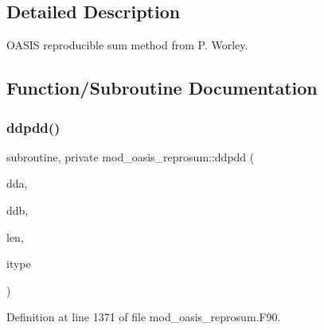 \subsection{Detailed Description}
O\+A\+S\+IS reproducible sum method from P. Worley. 

\subsection{Function/\+Subroutine Documentation}
\mbox{\label{namespacemod__oasis__reprosum_a24f9efa3ca739811888206eaf71d4690}} 
\subsubsection{\texorpdfstring{ddpdd()}{ddpdd()}}
{\footnotesize\ttfamily subroutine, private mod\+\_\+oasis\+\_\+reprosum\+::ddpdd (\begin{DoxyParamCaption}\item[{complex(r8), dimension(len), intent(in)}]{dda,  }\item[{complex(r8), dimension(len), intent(inout)}]{ddb,  }\item[{integer, intent(in)}]{len,  }\item[{integer, intent(in)}]{itype }\end{DoxyParamCaption})\hspace{0.3cm}{\ttfamily [private]}}



Definition at line 1371 of file mod\+\_\+oasis\+\_\+reprosum.\+F90.

\mbox{\label{namespacemod__oasis__reprosum_a398280c78cff126b7622dbd96af675e4}} 
